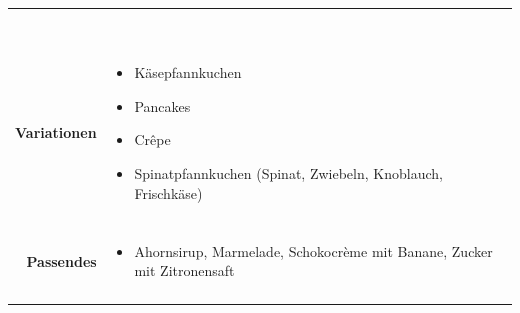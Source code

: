 \documentclass[a4paper, 12pt]{scrbook} 								%
\numberwithin{equation}{section} 									%
\begin{document}
\begin{tabularx}{\textwidth}{r|L}
\begin{tabular}[t]{llll}
										\end{tabular}	\\
									&	\\
			\textbf{Variationen}	&	\begin{itemize}[nosep]
											\item Käsepfannkuchen
											\item Pancakes
											\item Crêpe
											\item Spinatpfannkuchen (Spinat, Zwiebeln, Knoblauch, Frischkäse)
										\end{itemize}	\\
									&	\\	
			\textbf{Passendes}		&	\begin{itemize}[nosep]
											\item Ahornsirup, Marmelade, Schokocrème mit Banane, Zucker mit Zitronensaft
										\end{itemize}	\\
									&	\\	
		\end{tabularx}
\end{document}
